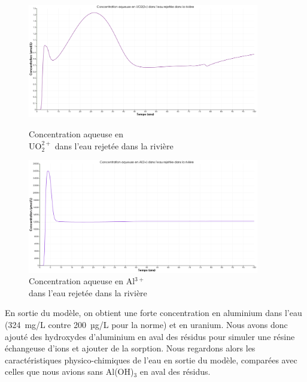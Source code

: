\documentclass{article}
\begin{document}
\begin{figure}[b]
    \centering
    \begin{minipage}{0.5\textwidth}
        \centering
        \includegraphics[width=0.9\textwidth]{III_B_2_20.png} 
        \caption{Concentration aqueuse en \\UO$_2^{2+}$ dans l'eau rejetée dans la rivière}
        \label{fig:UO2_riviere_Al}
    \end{minipage}\hfill
    \begin{minipage}{0.5\textwidth}
        \centering
        \includegraphics[width=0.9\textwidth]{III_B_2_21.png} 
        \caption{Concentration aqueuse en Al$^{3+}$ \\dans l'eau rejetée dans la rivière}
        \label{fig:Al_riviere_Al}
    \end{minipage}
\end{figure}


En sortie du modèle, on obtient une forte concentration en aluminium dans l’eau (324~mg/L contre 200~µg/L pour la norme) et en uranium. Nous avons donc ajouté des hydroxydes d’aluminium en aval des résidus pour simuler une résine échangeuse d’ions et ajouter de la sorption.
Nous regardons alors les caractéristiques physico-chimiques de l’eau en sortie du modèle, comparées avec celles que nous avions sans Al(OH)$_3$ en aval des résidus.
\end{document}
